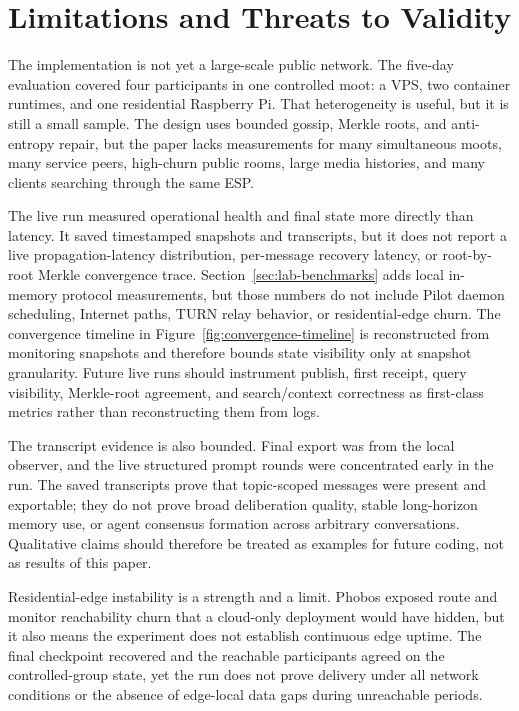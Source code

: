 \documentclass[11pt,a4paper,twocolumn]{article}
\begin{document}
\section{Limitations and Threats to Validity}
\label{sec:limitations}

The implementation is not yet a large-scale public network. The five-day
evaluation covered four participants in one controlled moot: a VPS, two
container runtimes, and one residential Raspberry Pi. That heterogeneity is
useful, but it is still a small sample. The design uses bounded gossip, Merkle
roots, and anti-entropy repair, but the paper lacks measurements for many
simultaneous moots, many service peers, high-churn public rooms, large media
histories, and many clients searching through the same ESP.

The live run measured operational health and final state more directly than
latency. It saved timestamped snapshots and transcripts, but it does not
report a live propagation-latency distribution, per-message recovery latency,
or root-by-root Merkle convergence trace. Section~\ref{sec:lab-benchmarks}
adds local in-memory protocol measurements, but those numbers do not include
Pilot daemon scheduling, Internet paths, TURN relay behavior, or
residential-edge churn. The convergence timeline in
Figure~\ref{fig:convergence-timeline} is reconstructed from monitoring
snapshots and therefore bounds state visibility only at snapshot granularity.
Future live runs should instrument publish, first receipt, query visibility,
Merkle-root agreement, and search/context correctness as first-class metrics
rather than reconstructing them from logs.

The transcript evidence is also bounded. Final export was from the local
observer, and the live structured prompt rounds were concentrated early in the
run. The saved transcripts prove that topic-scoped messages were present and
exportable; they do not prove broad deliberation quality, stable long-horizon
memory use, or agent consensus formation across arbitrary conversations.
Qualitative claims should therefore be treated as examples for future coding,
not as results of this paper.

Residential-edge instability is a strength and a limit. Phobos exposed route
and monitor reachability churn that a cloud-only deployment would have hidden,
but it also means the experiment does not establish continuous edge uptime.
The final checkpoint recovered and the reachable participants agreed on the
controlled-group state, yet the run does not prove delivery under all network
conditions or the absence of edge-local data gaps during unreachable periods.
\end{document}
